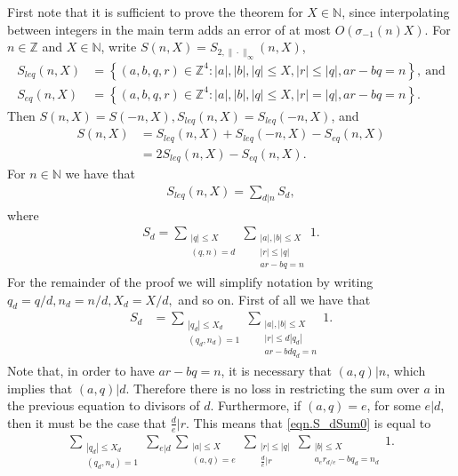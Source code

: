 \documentclass[reqno]{amsart}
\newcommand{\N}{\mathbb{N}}
\newcommand{\Z}{\mathbb{Z}}
\begin{document}
First note that it is sufficient to prove the theorem for $X\in\N$, since interpolating between integers in the main term adds an error of at most $O(\sigma_{-1}(n)X)$. For $n\in\Z$ and $X\in\N$, write $S(n,X)=S_{2,\|\cdot\|_\infty}(n,X)$,
\begin{align*}
	S_{leq}(n,X)&=\left\{(a,b,q,r)\in\Z^4 : |a|,|b|,|q|\le X, |r|\le |q|, ar-bq=n\right\},~\text{and}\\
	S_{eq}(n,X)&=\left\{(a,b,q,r)\in\Z^4 : |a|,|b|,|q|\le X, |r|= |q|, ar-bq=n\right\}.
\end{align*}
Then $S(n,X)=S(-n,X), S_{leq}(n,X)=S_{leq}(-n,X)$, and
\begin{align}
	S(n,X)&=S_{leq}(n,X)+S_{leq}(-n,X)-S_{eq}(n,X)\nonumber\\
	&=2S_{leq}(n,X)-S_{eq}(n,X).\label{eqn.S_dSum-1}
\end{align}
For $n\in\N$ we have that
\begin{align*}
	S_{leq}(n,X)=\sum_{d|n}S_d,
\end{align*}
where
\begin{align*}
	S_d=\sum_{\substack{|q|\le X\\(q,n)=d}}\sum_{\substack{|a|,|b|\le X\\|r|\le |q|\\ar-bq=n}}1.
\end{align*}
For the remainder of the proof we will simplify notation by writing $q_d=q/d, n_d=n/d, X_d=X/d,$ and so on. First of all we have that
\begin{align}\label{eqn.S_dSum0}
	S_d&=\sum_{\substack{|q_d|\le X_d\\(q_d,n_d)=1}}\sum_{\substack{|a|,|b|\le X\\|r|\le d|q_d|\\ar-bdq_d=n}}1.
\end{align}
Note that, in order to have $ar-bq=n$, it is necessary that $(a,q)|n$, which implies that $(a,q)|d$. Therefore there is no loss in restricting the sum over $a$ in the previous equation to divisors of $d$. Furthermore, if $(a,q)=e$, for some $e|d$, then it must be the case that $\frac{d}{e}|r$.  This means that \eqref{eqn.S_dSum0} is equal to
\begin{align*}
\sum_{\substack{|q_d|\le X_d\\(q_d,n_d)=1}}\sum_{e|d}\sum_{\substack{|a|\le X\\(a,q)=e}}\sum_{\substack{|r|\le|q|\\\frac{d}{e}|r}}\sum_{\substack{|b|\le X\\a_er_{d/e}-bq_d=n_d}}1.
\end{align*}
\end{document}
